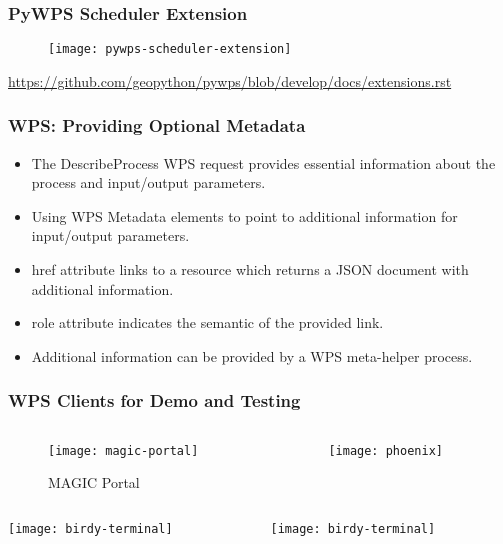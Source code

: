 \documentclass{beamer}
\begin{document}
\begin{frame}
\frametitle<presentation>{PyWPS Scheduler Extension}

  \begin{figure}[ht]
    \centering
    \texttt{[image: pywps-scheduler-extension]}
  \end{figure}

  \centering
  \footnotesize{\url{https://github.com/geopython/pywps/blob/develop/docs/extensions.rst}}

\end{frame}

\begin{frame}
\frametitle<presentation>{WPS: Providing Optional Metadata}

  \begin{itemize}
    \item The DescribeProcess WPS request provides essential information about the process and input/output parameters.
    \item Using WPS Metadata elements to point to additional information for input/output parameters.
    \item href attribute links to a resource which returns a JSON document with additional information.
    \item role attribute indicates the semantic of the provided link.
    \item Additional information can be provided by a WPS meta-helper process.
  \end{itemize}

\end{frame}

\begin{frame}
\frametitle<presentation>{WPS Clients for Demo and Testing}
\begin{columns}[c]
  \begin{column}{.5\textwidth}
    \begin{figure}[h!]
      \centering
      \texttt{[image: magic-portal]}
      \caption{MAGIC Portal}
    \end{figure}
  \end{column}
  \begin{column}{.5\textwidth}
    \texttt{[image: phoenix]}
  \end{column}
\end{columns}
\vrule
\begin{columns}[c]
  \begin{column}{.5\textwidth}
    \texttt{[image: birdy-terminal]}
  \end{column}
  \begin{column}{.5\textwidth}
    \texttt{[image: birdy-terminal]}
  \end{column}
\end{columns}

\end{frame}
\end{document}
